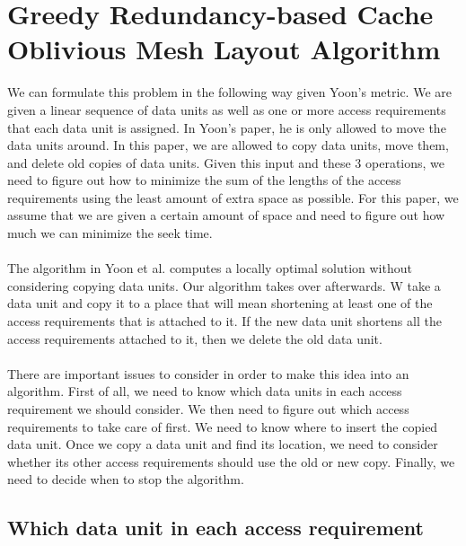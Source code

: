 \documentclass[conference]{acmsiggraph}
\begin{document}
\section{Greedy Redundancy-based Cache Oblivious Mesh Layout Algorithm}

We can formulate this problem in the following way given Yoon's metric. We are given a linear sequence of data units as well as one or more access requirements that each data unit is assigned. In Yoon's paper, he is only allowed to move the data units around. In this paper, we are allowed to copy data units, move them, and delete old copies of data units. Given this input and these 3 operations, we need to figure out how to minimize the sum of the lengths of the access requirements using the least amount of extra space as possible. For this paper, we assume that we are given a certain amount of space and need to figure out how much we can minimize the seek time.\\
\\
The algorithm in Yoon et al. computes a locally optimal solution without considering copying data units. Our algorithm takes over afterwards. W take a data unit and copy it to a place that will mean shortening at least one of the access requirements that is attached to it. If the new data unit shortens all the access requirements attached to it, then we delete the old data unit. \\
\\
There are important issues to consider in order to make this idea into an algorithm. First of all, we need to know which data units in each access requirement we should consider. We then need to figure out which access requirements to take care of first. We need to know where to insert the copied data unit. Once we copy a data unit and find its location, we need to consider whether its other access requirements should use the old or new copy. Finally, we need to decide when to stop the algorithm.  

\subsection{Which data unit in each access requirement}
\end{document}
